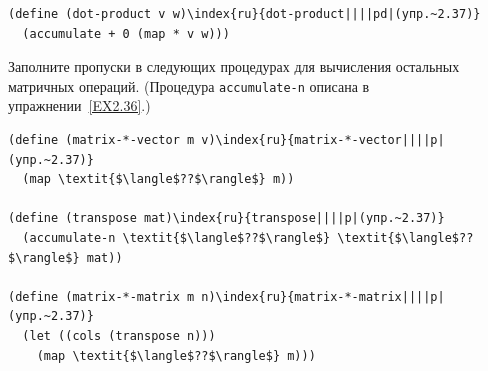 \begin{exercise}{2.37}
\begin{Verbatim}[fontsize=\small]
(define (dot-product v w)\index{ru}{dot-product||||pd|(упр.~2.37)}
  (accumulate + 0 (map * v w)))
\end{Verbatim}
Заполните пропуски в следующих процедурах для вычисления остальных
матричных операций. (Процедура {\tt accumulate-n} описана в
упражнении~\ref{EX2.36}.)

\begin{Verbatim}[fontsize=\small]
(define (matrix-*-vector m v)\index{ru}{matrix-*-vector||||p|(упр.~2.37)}
  (map \textit{$\langle$??$\rangle$} m))

(define (transpose mat)\index{ru}{transpose||||p|(упр.~2.37)}
  (accumulate-n \textit{$\langle$??$\rangle$} \textit{$\langle$??$\rangle$} mat))

(define (matrix-*-matrix m n)\index{ru}{matrix-*-matrix||||p|(упр.~2.37)}
  (let ((cols (transpose n)))
    (map \textit{$\langle$??$\rangle$} m)))
\end{Verbatim}
\end{exercise}

